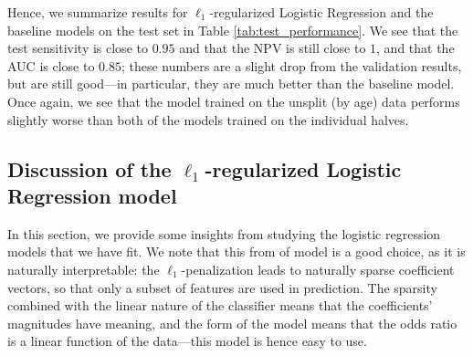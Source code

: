 \documentclass[11pt, letterpaper]{amsart}
\let\Oldsubsection\subsection
\renewcommand{\subsection}{\FloatBarrier\Oldsubsection}
\begin{document}
Hence, we summarize results for $\ell_1$-regularized Logistic Regression and the baseline models on the test set in Table \ref{tab:test_performance}. We see that the test sensitivity is close to $0.95$ and that the NPV is still close to $1$, and that the AUC is close to $0.85$; these numbers are a slight drop from the validation results, but are still good---in particular, they are much better than the baseline model. Once again, we see that the model trained on the unsplit (by age) data performs slightly worse than both of the models trained on the individual halves. 
\begin{table}[h]
\caption{Algorithm performance on test data for each data split}\label{tab:test_performance}
\end{table}

\subsection{Discussion of the $\ell_1$-regularized Logistic Regression model}

In this section, we provide some insights from studying the logistic regression models that we have fit. We note that this from of model is a good choice, as it is naturally interpretable: the $\ell_1$-penalization leads to naturally sparse coefficient vectors, so that only a subset of features are used in prediction. The sparsity combined with the linear nature of the classifier means that the coefficients' magnitudes have meaning, and the form of the model means that the odds ratio is a linear function of the data---this model is hence easy to use. 
\end{document}
